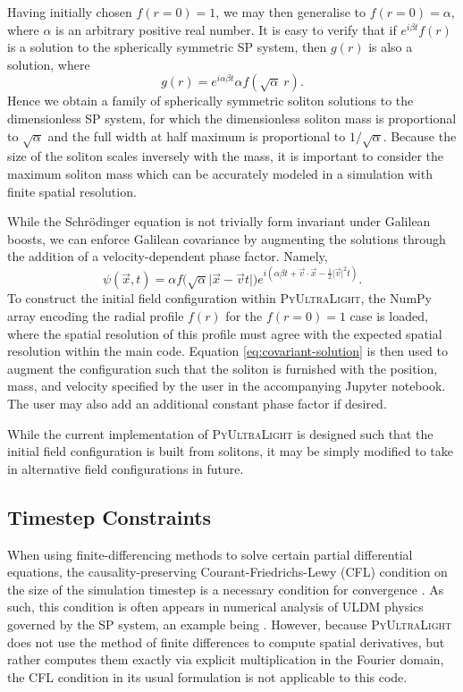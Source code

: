 \documentclass[a4paper,11pt]{article}
\newcommand{\PyUltraLight}{\textsc{PyUltraLight}\xspace}
\begin{document}
Having initially chosen $f(r=0)=1$, we may then generalise to $f(r=0)=\alpha$, where $\alpha$ is an arbitrary positive real number. It is easy to verify that if $e^{i\beta t}f(r)$ is a solution to the spherically symmetric SP system, then $g(r)$ is also a solution, where
\begin{equation}
    g(r)=e^{i\alpha\beta t}\alpha f(\sqrt{\alpha}\ r).
\end{equation}
Hence we obtain a family of spherically symmetric soliton solutions to the dimensionless SP system, for which the dimensionless soliton mass is proportional to $\sqrt{\alpha}$ and the full width at half maximum is proportional to $1/\sqrt{\alpha}$. Because the size of the soliton scales inversely with the mass, it is important to consider the maximum soliton mass which can be accurately modeled in a simulation with finite spatial resolution. 

While the Schr{\"o}dinger equation is not trivially form invariant under Galilean boosts, we can enforce Galilean covariance by augmenting the solutions through the addition of a velocity-dependent phase factor. Namely,
\begin{equation}\label{eq:covariant-solution}
    \psi(\vec{x},t)=\alpha f\big(\sqrt{\alpha}\vert\vec{x}-\vec{v}t\vert\big)e^{i\left(\alpha\beta t+\vec{v}\cdot\vec{x}-\frac{1}{2}\vert\vec{v}\vert^2t\right)}.
\end{equation}
To construct the initial field configuration within \PyUltraLight, the NumPy array encoding the radial profile $f(r)$ for the $f(r=0)=1$ case is loaded, where the spatial resolution of this profile must agree with the expected spatial resolution within the main code. Equation \ref{eq:covariant-solution} is then used to augment the configuration such that the soliton is furnished with the position, mass, and velocity specified by the user in the accompanying Jupyter notebook. The user may also add an additional constant phase factor if desired.

While the current implementation of \PyUltraLight is designed such that the initial field configuration is built from solitons, it may be simply modified to take in alternative field configurations in future.  

\subsection{Timestep Constraints}

When using finite-differencing methods to solve certain partial differential equations, the causality-preserving Courant-Friedrichs-Lewy (CFL) condition on the size of the simulation timestep is a necessary condition for convergence \cite{Ajaib2013}. As such, this condition is often appears in numerical analysis of ULDM physics governed by the SP system, an example being \cite{Schwabe2016}. However, because \PyUltraLight does not use the method of finite differences to compute spatial derivatives, but rather computes them exactly via explicit multiplication in the Fourier domain, the CFL condition in its usual formulation is not applicable to this code. 
\end{document}
